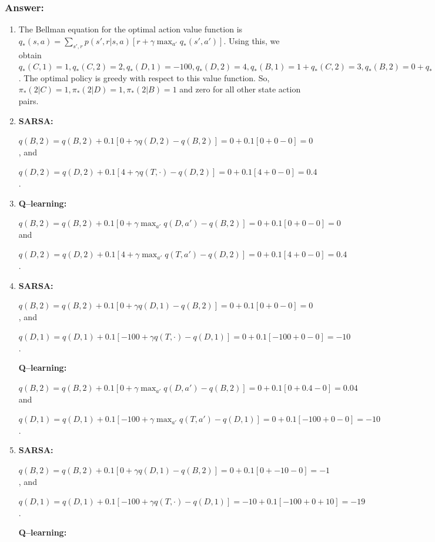 \documentclass[a4paper, 10pt]{article}
\begin{document}
\subsubsection*{Answer:}
\begin{enumerate}
\item The Bellman equation for the optimal action value function is $q_*(s, a) = \sum_{s', r} p(s', r|s, a)[r + \gamma \max_{a'} q_*(s', a')]$. Using this, we obtain $q_*(C, 1) = 1, q_*(C, 2) = 2, q_*(D, 1) = -100, q_*(D, 2) = 4, q_*(B, 1) = 1+q_*(C, 2) = 3, q_*(B, 2) = 0+q_*(D, 2) = 4$. The optimal policy is greedy with respect to this value function. So, $\pi_*(2|C) = 1, \pi_*(2|D) = 1, \pi_*(2|B) = 1$ and zero for all other state action pairs.
\item  \textbf{SARSA:}

  $q(B, 2) = q(B, 2) + 0.1 [0 + \gamma q(D, 2) - q(B, 2)] = 0 + 0.1[0 + 0-0] = 0$, and

  $q(D, 2) = q(D, 2) + 0.1 [4 + \gamma q(T, \cdot) - q(D, 2)] = 0 + 0.1[4 + 0-0] = 0.4$.
  
\item\textbf{Q--learning:}

  $q(B, 2) = q(B, 2) + 0.1 [0 + \gamma \max_{a'} q(D, a') - q(B, 2)] = 0 + 0.1[0 + 0 - 0] = 0$ and

  $q(D, 2) = q(D, 2) + 0.1 [4 + \gamma \max_{a'} q(T, a') - q(D, 2)] = 0 + 0.1[4 + 0 - 0] = 0.4$.
  
\item
  \textbf{SARSA:}
  
  $q(B, 2) = q(B, 2) + 0.1 [0 + \gamma q(D, 1) - q(B, 2)] = 0 + 0.1[0 + 0-0] = 0$, and

  $q(D, 1) = q(D, 1) + 0.1 [-100 + \gamma q(T, \cdot) - q(D, 1)] = 0 + 0.1[-100  +0-0] = -10$.

  \textbf{Q--learning:}

  $q(B, 2) = q(B, 2) + 0.1 [0 + \gamma \max_{a'} q(D, a') - q(B, 2)] = 0 + 0.1[0 + 0.4 - 0] = 0.04$ and

  $q(D, 1) = q(D, 1) + 0.1 [-100 + \gamma \max_{a'} q(T, a') - q(D, 1)] = 0 + 0.1[-100 + 0 - 0] = -10$.
  
  
\item
    \textbf{SARSA:}
  
  $q(B, 2) = q(B, 2) + 0.1 [0 + \gamma q(D, 1) - q(B, 2)] = 0 + 0.1[0 + -10 -0] = -1$, and

  $q(D, 1) = q(D, 1) + 0.1 [-100 + \gamma q(T, \cdot) - q(D, 1)] = -10 + 0.1[-100  +0+10] = -19$.

  \textbf{Q--learning:}


\end{enumerate}
\end{document}
